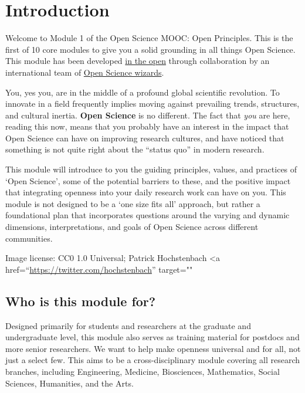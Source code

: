 \documentclass[]{book}
\begin{document}
\hypertarget{introduction}{%
\section{Introduction }\label{introduction}}

Welcome to Module 1 of the Open Science MOOC: Open Principles. This is the first of 10 core modules to give you a solid grounding in all things Open Science. This module has been developed \href{https://github.com/OpenScienceMOOC/Module-1-Open-Principles}{in the open} through collaboration by an international team of \protect\hyperlink{Development_team}{Open Science wizards}.

You, yes you, are in the middle of a profound global scientific revolution. To innovate in a field frequently implies moving against prevailing trends, structures, and cultural inertia. \textbf{Open Science} is no different. The fact that \emph{you} are here, reading this now, means that you probably have an interest in the impact that Open Science can have on improving research cultures, and have noticed that something is not quite right about the ``status quo'' in modern research.

This module will introduce to you the guiding principles, values, and practices of `Open Science', some of the potential barriers to these, and the positive impact that integrating openness into your daily research work can have on you. This module is not designed to be a `one size fits all' approach, but rather a foundational plan that incorporates questions around the varying and dynamic dimensions, interpretations, and goals of Open Science across different communities.

Image license: CC0 1.0 Universal; Patrick Hochstenbach \textless{}a href=``\url{https://twitter.com/hochstenbach}'' target=""

\hypertarget{who-is-this-module-for}{%
\subsection{Who is this module for? }\label{who-is-this-module-for}}

Designed primarily for students and researchers at the graduate and undergraduate level, this module also serves as training material for postdocs and more senior researchers. We want to help make openness universal and for all, not just a select few. This aims to be a cross-disciplinary module covering all research branches, including Engineering, Medicine, Biosciences, Mathematics, Social Sciences, Humanities, and the Arts.
\end{document}
